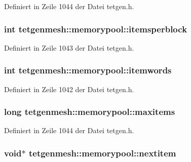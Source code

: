 Definiert in Zeile 1044 der Datei tetgen.\-h.

\hypertarget{classtetgenmesh_1_1memorypool_a06ef9dbd1dec025a8c0475aaac348d3a}{
\subsubsection[{itemsperblock}]{\setlength{\rightskip}{0pt plus 5cm}int tetgenmesh\-::memorypool\-::itemsperblock}}\label{classtetgenmesh_1_1memorypool_a06ef9dbd1dec025a8c0475aaac348d3a}


Definiert in Zeile 1043 der Datei tetgen.\-h.

\hypertarget{classtetgenmesh_1_1memorypool_a11a5e52e6559d7fcd95de844d69a37a4}{
\subsubsection[{itemwords}]{\setlength{\rightskip}{0pt plus 5cm}int tetgenmesh\-::memorypool\-::itemwords}}\label{classtetgenmesh_1_1memorypool_a11a5e52e6559d7fcd95de844d69a37a4}


Definiert in Zeile 1042 der Datei tetgen.\-h.

\hypertarget{classtetgenmesh_1_1memorypool_ae9dda5bafe91eed206b26fa7d7020716}{
\subsubsection[{maxitems}]{\setlength{\rightskip}{0pt plus 5cm}long tetgenmesh\-::memorypool\-::maxitems}}\label{classtetgenmesh_1_1memorypool_ae9dda5bafe91eed206b26fa7d7020716}


Definiert in Zeile 1044 der Datei tetgen.\-h.

\hypertarget{classtetgenmesh_1_1memorypool_ab0864200773e9371db60d190fb0c3cf7}{
\subsubsection[{nextitem}]{\setlength{\rightskip}{0pt plus 5cm}void$\ast$ tetgenmesh\-::memorypool\-::nextitem}}\label{classtetgenmesh_1_1memorypool_ab0864200773e9371db60d190fb0c3cf7}


